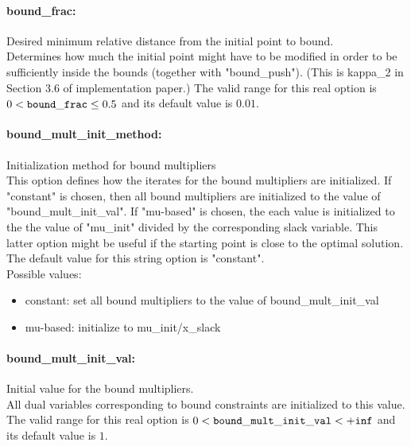 \paragraph{bound\_frac:}\label{sec:bound_frac} Desired minimum relative distance from the initial point to bound. $\;$ \\
 Determines how much the initial point might have
to be modified in order to be sufficiently inside
the bounds (together with "bound\_push").  (This
is kappa\_2 in Section 3.6 of implementation
paper.) The valid range for this real option is 
$0 <  {\tt bound\_frac } \le 0.5$
and its default value is $0.01$.


\paragraph{bound\_mult\_init\_method:}\label{sec:bound_mult_init_method} Initialization method for bound multipliers $\;$ \\
 This option defines how the iterates for the
bound multipliers are initialized.  If "constant"
is chosen, then all bound multipliers are
initialized to the value of
"bound\_mult\_init\_val".  If "mu-based" is
chosen, the each value is initialized to the the
value of "mu\_init" divided by the corresponding
slack variable.  This latter option might be
useful if the starting point is close to the
optimal solution.
The default value for this string option is "constant".
\\ 
Possible values:
\begin{itemize}
   \item constant: set all bound multipliers to the value of
bound\_mult\_init\_val
   \item mu-based: initialize to mu\_init/x\_slack
\end{itemize}

\paragraph{bound\_mult\_init\_val:}\label{sec:bound_mult_init_val} Initial value for the bound multipliers. $\;$ \\
 All dual variables corresponding to bound
constraints are initialized to this value. The valid range for this real option is 
$0 <  {\tt bound\_mult\_init\_val } <  {\tt +inf}$
and its default value is $1$.


